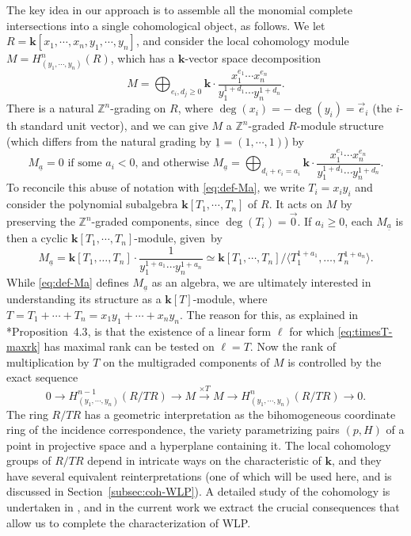 \documentclass[11pt,reqno]{amsart}
\def\kk{{\mathbf k}}
\newcommand{\bb}[1]{\mathbb{#1}}
\newcommand{\ul}[1]{\underline{#1}}
\def\lra{\longrightarrow}
\theoremstyle{definition}
\theoremstyle{remark}
\numberwithin{equation}{section}
\begin{document}
The key idea in our approach is to assemble all the monomial complete intersections into a single cohomological object, as follows. We let $R = \kk[x_1,\cdots,x_n,y_1,\cdots,y_n]$, and consider the local cohomology module $M=H^n_{(y_1,\cdots,y_n)}(R)$, which has a $\kk$-vector space decomposition
\[M=\bigoplus_{e_i,d_j\geq 0} \kk\cdot\frac{x_1^{e_1}\cdots x_n^{e_n}}{y_1^{1+d_1}\cdots y_n^{1+d_n}}.\]
There is a natural $\bb{Z}^n$-grading on $R$, where $\deg(x_i) = -\deg(y_i) = \vec{e}_i$ (the $i$-th standard unit vector), and we can give $M$ a $\bb{Z}^n$-graded $R$-module structure (which differs from the natural grading by $\ul{1}=(1,\cdots,1)$) by
\[M_{\ul{a}} = 0\text{ if some $a_i<0$, and otherwise }M_{\ul{a}} =  \bigoplus_{d_i+e_i=a_i}\kk\cdot\frac{x_1^{e_1}\cdots x_n^{e_n}}{y_1^{1+d_1}\cdots y_n^{1+d_n}}.\]
To reconcile this abuse of notation with \eqref{eq:def-Ma}, we write $T_i = x_iy_i$ and consider the polynomial subalgebra $\kk[T_1,\cdots,T_n]$ of $R$. It acts on $M$ by preserving the $\bb{Z}^n$-graded components, since $\deg(T_i)=\vec{0}$. If $a_i\geq 0$, each $M_{\ul{a}}$ is then a cyclic $\kk[T_1,\cdots,T_n]$-module, given~by
\begin{equation}\label{eq:Ma-cyclic-module}
M_{\ul{a}} = \kk[T_1,\ldots,T_n]\cdot\frac{1}{y_1^{1+a_1}\cdots y_n^{1+a_n}} \simeq \kk[T_1,\cdots,T_n]/\langle T_1^{1+a_1},\ldots,T_n^{1+a_n}\rangle.
\end{equation}
While \eqref{eq:def-Ma} defines $M_{\ul{a}}$ as an algebra, we are ultimately interested in understanding its structure as a $\kk[T]$-module, where $T=T_1+\cdots+T_n=x_1y_1+\cdots+x_ny_n$. The reason for this, as explained in \cite{lund-nick}*{Proposition~4.3}, is that the existence of a linear form $\ell$ for which \eqref{eq:timesT-maxrk} has maximal rank can be tested on $\ell=T$. Now the rank of multiplication by $T$ on the multigraded components of $M$ is controlled by the exact sequence
\[0 \lra H^{n-1}_{(y_1,\cdots,y_n)}(R/TR) \lra M \overset{\times T}{\lra} M \lra H^n_{(y_1,\cdots,y_n)}(R/TR) \lra 0. \]
The ring $R/TR$ has a geometric interpretation as the bihomogeneous coordinate ring of the incidence correspondence, the variety parametrizing pairs $(p,H)$ of a point in projective space and a hyperplane containing it. The local cohomology groups of $R/TR$ depend in intricate ways on the characteristic of $\kk$, and they have several equivalent reinterpretations (one of which will be used here, and is discussed in Section~\ref{subsec:coh-WLP}). A detailed study of the cohomology is undertaken in \cite{KMRR}, and in the current work we extract the crucial consequences that allow us to complete the characterization of WLP.
\end{document}
